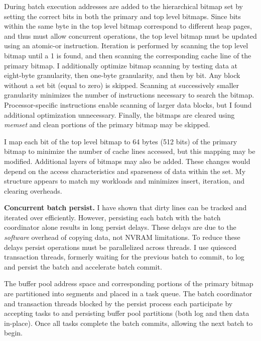 During batch execution addresses are added to the hierarchical bitmap set by setting the correct bits in both the primary and top level bitmaps.
Since bits within the same byte in the top level bitmap correspond to different heap pages, and thus must allow concurrent operations, the top level bitmap must be updated using an atomic-or instruction.
Iteration is performed by scanning the top level bitmap until a 1 is found, and then scanning the corresponding cache line of the primary bitmap.
I additionally optimize bitmap scanning by testing data at eight-byte granularity, then one-byte granularity, and then by bit.
Any block without a set bit (equal to zero) is skipped.
Scanning at successively smaller granularity minimizes the number of instructions necessary to search the bitmap.
Processor-specific instructions enable scanning of larger data blocks, but I found additional optimization unnecessary.
Finally, the bitmaps are cleared using \emph{memset} and clean portions of the primary bitmap may be skipped.

I map each bit of the top level bitmap to 64 bytes (512 bits) of the primary bitmap to minimize the number of cache lines accessed, but this mapping may be modified.
Additional layers of bitmaps may also be added.
These changes would depend on the access characteristics and sparseness of data within the set.
My structure appears to match my workloads and minimizes insert, iteration, and clearing overheads.

\textbf{Concurrent batch persist.}
I have shown that dirty lines can be tracked and iterated over efficiently.
However, persisting each batch with the batch coordinator alone results in long persist delays.
These delays are due to the \emph{software} overhead of copying data, not NVRAM limitations.
To reduce these delays persist operations must be parallelized across threads.
I use quiesced transaction threads, formerly waiting for the previous batch to commit, to log and persist the batch and accelerate batch commit.

The buffer pool address space and corresponding portions of the primary bitmap are partitioned into segments and placed in a task queue.
The batch coordinator and transaction threads blocked by the persist process each participate by accepting tasks to and persisting buffer pool partitions (both log and then data in-place).
Once all tasks complete the batch commits, allowing the next batch to begin.

